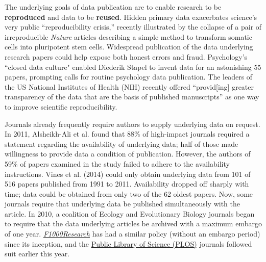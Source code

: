 \documentclass[10pt,a4paper,twocolumn]{article}
\begin{document}
The underlying goals of data publication are to enable research to be \textbf{reproduced} and data to be \textbf{reused}.
Hidden primary data exacerbates science's very public ``reproducibility crisis,''\cite{mobley_survey_2013,pashler_is_2012,zimmer_rise_2012,hiltzik_science_2013,begley_drug_2012} recently illustrated by the collapse of a pair of irreproducible \textit{Nature} articles describing a simple method to transform somatic cells into pluripotent stem cells\cite{cyranoski_acid-bath_2014, tabuchi_one_2014}.
Widespread publication of the data underlying research papers could help expose both honest errors and fraud\cite{drew_lost_2013}.
Psychology's ``closed data culture"\cite{doorn_lies_2013} enabled Diederik Stapel to invent data for an astonishing 55 papers, prompting calls for routine psychology data publication\cite{levelt_committee_flawed_2012,wicherts_psychology_2011,doorn_lies_2013}.  
The leaders of the US National Institutes of Health (NIH) recently offered ``provid[ing] greater transparency of the data that are the basis of published manuscripts'' as one way to improve scientific reproducibility\cite{collins_nih_2014}.

Journals already frequently require authors to supply underlying data on request.
In 2011, Alsheikh-Ali et al.\cite{alsheikh-ali_public_2011} found that 88\% of high-impact journals required a statement regarding the availability of underlying data; half of those made willingness to provide data a condition of publication.
However, the authors of 59\% of papers examined in the study failed to adhere to the availability instructions.
Vines et al. (2014)\cite{vines_availability_2014} could only obtain underlying data from 101 of 516 papers published from 1991 to 2011.
Availability dropped off sharply with time; data could be obtained from only two of the 62 oldest papers.
Now, some journals require that underlying data be published simultaneously with the article.
In 2010, a coalition of Ecology and Evolutionary Biology journals began to require that the data underlying articles be archived with a maximum embargo of one year\cite{whitlock_data_2010, fairbairn_advent_2011}.
\href{http://f1000research.com}{\emph{F1000Research}} has had a similar policy (without an embargo period) since its inception, and the {\href{http://www.plos.org/}{Public Library of Science (PLOS)}} journals followed suit earlier this year\cite{bloom_data_2014}.
\end{document}
